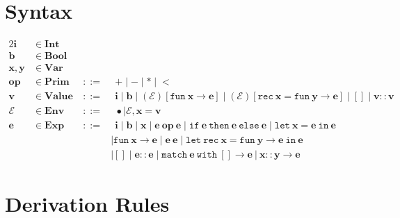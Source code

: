 \documentclass[10pt,landscape]{article}
\begin{document}
\section*{Syntax}

\vspace{30pt}

\begin{alignat*}{2}
    \boldsymbol{i} & \in \mathbf{Int} & &\\
    \boldsymbol{b} & \in \mathbf{Bool} & &\\
    \boldsymbol{x,y} & \in \mathbf{Var} & &\\
    \boldsymbol{op} & \in \mathbf{Prim} & ~ ::= & ~~ \boldsymbol{+} \mid \boldsymbol{-} \mid \boldsymbol{*} \mid \boldsymbol{<}\\
    \boldsymbol{v} & \in \mathbf{Value} & ~ ::= & ~~ \boldsymbol{i} \mid \boldsymbol{b} \mid (\boldsymbol{\mathcal{E}})[\mathtt{fun} ~ \boldsymbol{x} \to \boldsymbol{e}] \mid (\boldsymbol{\mathcal{E}})[\mathtt{rec} ~ \boldsymbol{x} = \mathtt{fun} ~ \boldsymbol{y} \to \boldsymbol{e}] \mid \boldsymbol{[]} \mid \boldsymbol{v} :: \boldsymbol{v}\\
    \boldsymbol{\mathcal{E}} & \in \mathbf{Env} & ~ ::= & ~~ \bullet \mid \boldsymbol{\mathcal{E}},\boldsymbol{x} = \boldsymbol{v}\\
    \boldsymbol{e} & \in \mathbf{Exp} & ~ ::= & ~~ \boldsymbol{i}
    \mid \boldsymbol{b}
    \mid \boldsymbol{x}
    \mid \boldsymbol{e ~ op ~ e}
    \mid \mathtt{if} ~ \boldsymbol{e} ~ \mathtt{then} ~ \boldsymbol{e} ~ \mathtt{else} ~ \boldsymbol{e}
    \mid \mathtt{let} ~ \boldsymbol{x = e} ~ \mathtt{in} ~ \boldsymbol{e}\\
    &&&\mid \mathtt{fun} ~ \boldsymbol{x} \to \boldsymbol{e}
    \mid \boldsymbol{e ~ e}
    \mid \mathtt{let ~ rec} ~ \boldsymbol{x} = \mathtt{fun} ~ \boldsymbol{y} \to \boldsymbol{e} ~ \mathtt{in} ~ \boldsymbol{e}\\
    &&&\mid \boldsymbol{[]}
    \mid \boldsymbol{e} :: \boldsymbol{e}
    \mid \mathtt{match} ~ \boldsymbol{e} ~ \mathtt{with} ~ \boldsymbol{[]} \to \boldsymbol{e} ~ \boldsymbol{|} ~ \boldsymbol{x} :: \boldsymbol{y} \to \boldsymbol{e}
\end{alignat*}

\newpage

\section*{Derivation Rules}

\vspace{30pt}
\end{document}
